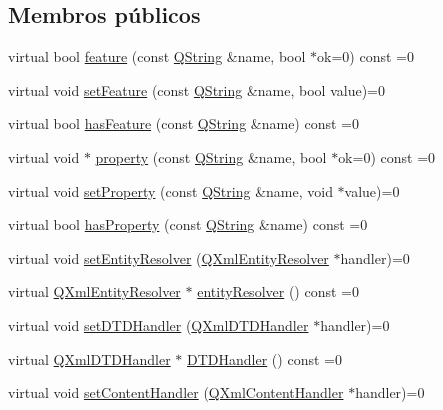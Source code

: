 \subsection*{Membros públicos}
\begin{DoxyCompactItemize}
\item 
virtual bool \hyperlink{class_q_xml_reader_a76d739f8a94bf314d757519bca040d96}{feature} (const \hyperlink{class_q_string}{Q\-String} \&name, bool $\ast$ok=0) const =0
\item 
virtual void \hyperlink{class_q_xml_reader_a54a21e60e28654ec1f5abd3d9307fb1a}{set\-Feature} (const \hyperlink{class_q_string}{Q\-String} \&name, bool value)=0
\item 
virtual bool \hyperlink{class_q_xml_reader_a94788a2d9d0391b73d49f2b5d59afb59}{has\-Feature} (const \hyperlink{class_q_string}{Q\-String} \&name) const =0
\item 
virtual void $\ast$ \hyperlink{class_q_xml_reader_a35b6ac10f0e2681f8b23f518f63d2ce0}{property} (const \hyperlink{class_q_string}{Q\-String} \&name, bool $\ast$ok=0) const =0
\item 
virtual void \hyperlink{class_q_xml_reader_a056a7c314b9cebe70878d0e0ec5da501}{set\-Property} (const \hyperlink{class_q_string}{Q\-String} \&name, void $\ast$value)=0
\item 
virtual bool \hyperlink{class_q_xml_reader_a35cf35e0b6114f1575ad0659404f3f00}{has\-Property} (const \hyperlink{class_q_string}{Q\-String} \&name) const =0
\item 
virtual void \hyperlink{class_q_xml_reader_a993026a62a7ba0b4ebc2e84e8df18d82}{set\-Entity\-Resolver} (\hyperlink{class_q_xml_entity_resolver}{Q\-Xml\-Entity\-Resolver} $\ast$handler)=0
\item 
virtual \hyperlink{class_q_xml_entity_resolver}{Q\-Xml\-Entity\-Resolver} $\ast$ \hyperlink{class_q_xml_reader_aa5c5d014fa59b7d2f3b0313b0e4cfc78}{entity\-Resolver} () const =0
\item 
virtual void \hyperlink{class_q_xml_reader_a4bec7f4998841732d1d8d14a6fb123ec}{set\-D\-T\-D\-Handler} (\hyperlink{class_q_xml_d_t_d_handler}{Q\-Xml\-D\-T\-D\-Handler} $\ast$handler)=0
\item 
virtual \hyperlink{class_q_xml_d_t_d_handler}{Q\-Xml\-D\-T\-D\-Handler} $\ast$ \hyperlink{class_q_xml_reader_a8222809c5178a2f9c6828f1c5f792da3}{D\-T\-D\-Handler} () const =0
\item 
virtual void \hyperlink{class_q_xml_reader_a481b7b578c8ad3764dc541d9b5fc44ce}{set\-Content\-Handler} (\hyperlink{class_q_xml_content_handler}{Q\-Xml\-Content\-Handler} $\ast$handler)=0

\end{DoxyCompactItemize}
